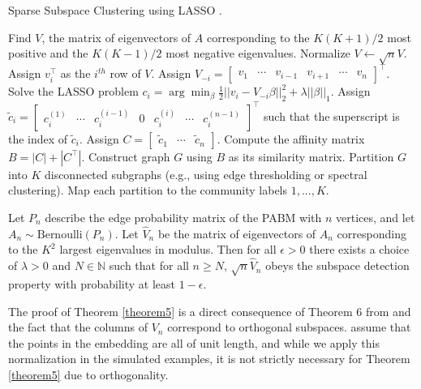 \documentclass[12pt]{article}
\begin{document}
\begin{algorithm}[t]
  \DontPrintSemicolon
  \SetAlgoLined
  \caption{Sparse Subspace Clustering using LASSO \cite{jmlr-v28-wang13}.}
    Find $V$, the matrix of eigenvectors of $A$
    corresponding to the $K (K + 1) / 2$ most positive
    and the $K (K - 1) / 2$ most negative eigenvalues.\;
    Normalize $V \leftarrow \sqrt{n} V$.\;
     {
      Assign $v_i^\top$ as the $i^{th}$ row of $V$.
      Assign $V_{-i} = \begin{bmatrix}
      v_1 & \cdots & v_{i-1} & v_{i+1} & \cdots & v_n \end{bmatrix}^\top$.\;
      Solve the LASSO problem
      $c_i = \arg\min_{\beta}
      \frac{1}{2} ||v_i - V_{-i} \beta||_2^2 + \lambda ||\beta||_1$.\;
      Assign $\tilde{c}_i = \begin{bmatrix}
      c_i^{(1)} & \cdots & c_i^{(i-1)} & 0 & c_i^{(i)} & \cdots & c_i^{(n-1)}
      \end{bmatrix}^\top$ such that the superscript is the index of
      $\tilde{c}_i$.\;
    }
    Assign
    $C = \begin{bmatrix} \tilde{c}_1 & \cdots & \tilde{c}_n \end{bmatrix}$.\;
    Compute the affinity matrix $B = |C| + |C^\top|$.\;
    Construct graph $G$ using $B$ as its similarity matrix.\;
    Partition $G$ into $K$ disconnected subgraphs (e.g., using edge
    thresholding or spectral clustering).\;
    Map each partition to the community labels $1, ..., K$.
\end{algorithm}

\begin{theorem}
\label{theorem5}
Let $P_n$ describe the edge probability matrix of the PABM with
$n$ vertices, and let $A_n \sim \text{Bernoulli}(P_n)$.  Let $\hat{V}_n$ be the
matrix of eigenvectors of $A_n$ corresponding to the $K^2$ largest
eigenvalues in modulus. Then for all $\epsilon > 0$ 
there exists a choice of $\lambda > 0$ and $N \in \mathbb{N}$ such
that for all $n \geq N$, $\sqrt{n} \hat{V}_n$ obeys the subspace detection property with
probability at least $1 - \epsilon$.  
\end{theorem}

\begin{remark}
The proof of Theorem \ref{theorem5} is a direct consequence of Theorem 6
from  \citeauthor{jmlr-v28-wang13} and the fact that the columns of
$V_n$ correspond to orthogonal subspaces. \citeauthor{jmlr-v28-wang13} assume
that the points in the embedding are all of unit length, and while we apply
this normalization in the simulated examples, it is not strictly necessary
for Theorem \ref{theorem5} due to orthogonality.
\end{remark}
\end{document}
